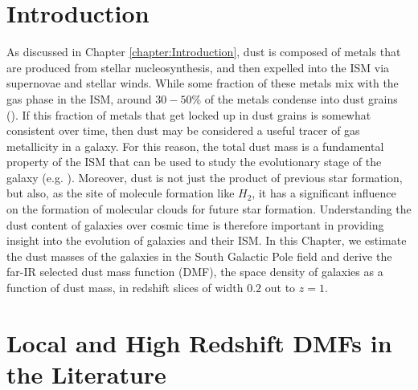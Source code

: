 \sloppy

\section{Introduction}

As discussed in Chapter \ref{chapter:Introduction}, dust is composed of metals that are produced from stellar nucleosynthesis, and then expelled into the ISM via supernovae and stellar winds. While some fraction of these metals mix with the gas phase in the ISM, around $30 - 50\%$ of the metals condense into dust grains (\citealt{Draine_2007b}). If this fraction of metals that get locked up in dust grains is somewhat consistent over time, then dust may be considered a useful tracer of gas metallicity in a galaxy. For this reason, the total dust mass is a fundamental property of the ISM that can be used to study the evolutionary stage of the galaxy (e.g. \citealt{Cortese_2012, deVis_2017a, deVis_2017b}). Moreover, dust is not just the product of previous star formation, but also, as the site of molecule formation like $H_2$, it has a significant influence on the formation of molecular clouds for future star formation. Understanding the dust content of galaxies over cosmic time is therefore important in providing insight into the evolution of galaxies and their ISM. In this Chapter, we estimate the dust masses of the galaxies in the South Galactic Pole field and derive the far-IR selected dust mass function (DMF), the space density of galaxies as a function of dust mass, in redshift slices of width $0.2$ out to $z = 1$.

\section{Local and High Redshift DMFs in the Literature}

